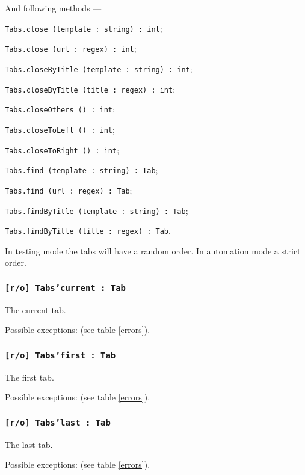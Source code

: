 And following methods —
\begin{icItems}
	\item \texttt{Tabs.close (template : string) : int};
	\item \texttt{Tabs.close (url : regex) : int};
	\item \texttt{Tabs.closeByTitle (template : string) : int};
	\item \texttt{Tabs.closeByTitle (title : regex) : int};
	\item \texttt{Tabs.closeOthers () : int};
	\item \texttt{Tabs.closeToLeft () : int};
	\item \texttt{Tabs.closeToRight () : int};
	\item \texttt{Tabs.find (template : string) : Tab};
	\item \texttt{Tabs.find (url : regex) : Tab};
	\item \texttt{Tabs.findByTitle (template : string) : Tab};
	\item \texttt{Tabs.findByTitle (title : regex) : Tab}.
\end{icItems}

In testing mode the tabs will have a random order. In automation mode a strict order.

\subsubsection{\texttt{[r/o] Tabs'current : Tab}}

The current tab.

Possible exceptions:  (see table \ref{errors}).

\subsubsection{\texttt{[r/o] Tabs'first : Tab}}

The first tab.

Possible exceptions:  (see table \ref{errors}).

\subsubsection{\texttt{[r/o] Tabs'last : Tab}}

The last tab.

Possible exceptions:  (see table \ref{errors}).

